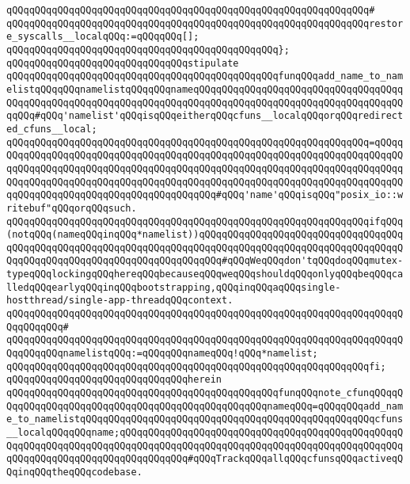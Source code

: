 \verb|qQQqqQQqqQQqqQQqqQQqqQQqqQQqqQQqqQQqqQQqqQQqqQQqqQQqqQQqqQQqqQQq#|\newline
\verb|qQQqqQQqqQQqqQQqqQQqqQQqqQQqqQQqqQQqqQQqqQQqqQQqqQQqqQQqqQQqqQQqrestore_syscalls__localqQQq:=qQQqqQQq[];|\newline
\verb|qQQqqQQqqQQqqQQqqQQqqQQqqQQqqQQqqQQqqQQqqQQqqQQq};|\newline
\newline
\verb|qQQqqQQqqQQqqQQqqQQqqQQqqQQqqQQqstipulate|\newline
\verb|qQQqqQQqqQQqqQQqqQQqqQQqqQQqqQQqqQQqqQQqqQQqqQQqfunqQQqadd_name_to_namelistqQQqqQQqnamelistqQQqqQQqnameqQQqqQQqqQQqqQQqqQQqqQQqqQQqqQQqqQQqqQQqqQQqqQQqqQQqqQQqqQQqqQQqqQQqqQQqqQQqqQQqqQQqqQQqqQQqqQQqqQQqqQQqqQQqqQQq#qQQq'namelist'qQQqisqQQqeitherqQQqcfuns__localqQQqorqQQqredirected_cfuns__local;|\newline
\verb|qQQqqQQqqQQqqQQqqQQqqQQqqQQqqQQqqQQqqQQqqQQqqQQqqQQqqQQqqQQqqQQq=qQQqqQQqqQQqqQQqqQQqqQQqqQQqqQQqqQQqqQQqqQQqqQQqqQQqqQQqqQQqqQQqqQQqqQQqqQQqqQQqqQQqqQQqqQQqqQQqqQQqqQQqqQQqqQQqqQQqqQQqqQQqqQQqqQQqqQQqqQQqqQQqqQQqqQQqqQQqqQQqqQQqqQQqqQQqqQQqqQQqqQQqqQQqqQQqqQQqqQQqqQQqqQQqqQQqqQQqqQQqqQQqqQQqqQQqqQQqqQQqqQQqqQQqqQQq#qQQq'name'qQQqisqQQq"posix_io::writebuf"qQQqorqQQqsuch.|\newline
\verb|qQQqqQQqqQQqqQQqqQQqqQQqqQQqqQQqqQQqqQQqqQQqqQQqqQQqqQQqqQQqqQQqifqQQq(notqQQq(nameqQQqinqQQq*namelist))qQQqqQQqqQQqqQQqqQQqqQQqqQQqqQQqqQQqqQQqqQQqqQQqqQQqqQQqqQQqqQQqqQQqqQQqqQQqqQQqqQQqqQQqqQQqqQQqqQQqqQQqqQQqqQQqqQQqqQQqqQQqqQQqqQQqqQQqqQQqqQQq#qQQqWeqQQqdon'tqQQqdoqQQqmutex-typeqQQqlockingqQQqhereqQQqbecauseqQQqweqQQqshouldqQQqonlyqQQqbeqQQqcalledqQQqearlyqQQqinqQQqbootstrapping,qQQqinqQQqaqQQqsingle-hostthread/single-app-threadqQQqcontext.|\newline
\verb|qQQqqQQqqQQqqQQqqQQqqQQqqQQqqQQqqQQqqQQqqQQqqQQqqQQqqQQqqQQqqQQqqQQqqQQqqQQqqQQq#|\newline
\verb|qQQqqQQqqQQqqQQqqQQqqQQqqQQqqQQqqQQqqQQqqQQqqQQqqQQqqQQqqQQqqQQqqQQqqQQqqQQqqQQqnamelistqQQq:=qQQqqQQqnameqQQq!qQQq*namelist;|\newline
\verb|qQQqqQQqqQQqqQQqqQQqqQQqqQQqqQQqqQQqqQQqqQQqqQQqqQQqqQQqqQQqqQQqfi;|\newline
\verb|qQQqqQQqqQQqqQQqqQQqqQQqqQQqqQQqherein|\newline
\verb|qQQqqQQqqQQqqQQqqQQqqQQqqQQqqQQqqQQqqQQqqQQqqQQqfunqQQqnote_cfunqQQqqQQqqQQqqQQqqQQqqQQqqQQqqQQqqQQqqQQqqQQqqQQqqQQqnameqQQq=qQQqqQQqadd_name_to_namelistqQQqqQQqqQQqqQQqqQQqqQQqqQQqqQQqqQQqqQQqqQQqqQQqqQQqcfuns__localqQQqqQQqname;qQQqqQQqqQQqqQQqqQQqqQQqqQQqqQQqqQQqqQQqqQQqqQQqqQQqqQQqqQQqqQQqqQQqqQQqqQQqqQQqqQQqqQQqqQQqqQQqqQQqqQQqqQQqqQQqqQQqqQQqqQQqqQQqqQQqqQQqqQQqqQQqqQQqqQQq#qQQqTrackqQQqallqQQqcfunsqQQqactiveqQQqinqQQqtheqQQqcodebase.|\newline

